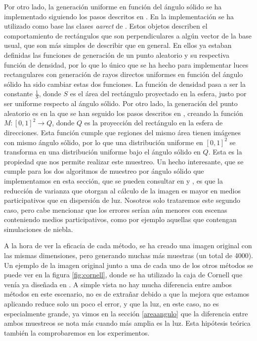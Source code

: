 \documentclass{scrbook}
\begin{document}
Por otro lado, la generación uniforme en función del ángulo sólido se ha implementado siguiendo los pasos descritos en \cite{ur2013}. En la implementación se ha utilizado como base las clases \textit{aarect} de \cite{RestOfYourLife}. Estos objetos describen el comportamiento de rectángulos que son perpendiculares a algún vector de la base usual, que son más simples de describir que en general. En ellos ya estaban definidas las funciones de generación de un punto aleatorio y su respectiva función de densidad, por lo que lo único que se ha hecho para implementar luces rectangulares con generación de rayos directos uniformes en función del ángulo sólido ha sido cambiar estas dos funciones. La función de densidad pasa a ser la constante $\frac{1}{S}$, donde $S$ es el área del rectángulo proyectado en la esfera, justo por ser uniforme respecto al ángulo sólido. Por otro lado, la generación del punto aleatorio es en la que se han seguido los pasos descritos en \cite{ur2013}, creando la función $M:[0,1]^2 \rightarrow Q$, donde $Q$ es la proyección del rectángulo en la esfera de direcciones. Esta función cumple que regiones del mismo área tienen imágenes con mismo ángulo sólido, por lo que una distribución uniforme en $[0,1]^2$ se transforma en una distribución uniforme bajo el ángulo sólido en $Q$. Esta es la propiedad que nos permite realizar este muestreo. Un hecho interesante, que se cumple para los dos algoritmos de muestreo por ángulo sólido que implementamos en esta sección, que se pueden consultar en \cite{ur2013} y \cite{ur2017}, es que la reducción de varianza que otorgan al cálculo de la imagen es mayor en medios participativos que en dispersión de luz. Nosotros solo trataremos este segundo caso, pero cabe mencionar que los errores serían aún menores con escenas conteniendo medios participativos, como por ejemplo aquellas que contengan simulaciones de niebla.

A la hora de ver la eficacia de cada método, se ha creado una imagen original con las mismas dimensiones, pero generando muchas más muestras (un total de 4000). Un ejemplo de la imagen original junto a una de cada uno de los otros métodos se puede ver en la figura \ref{fig:cornell}, donde se ha utilizado la caja de Cornell que venía ya diseñada en \cite{RestOfYourLife}. A simple vista no hay mucha diferencia entre ambos métodos en este escenario, no es de extrañar debido a que la mejora que estamos aplicando reduce solo un poco el error, y que la luz, en este caso, no es especialmente grande, ya vimos en la sección \ref{areaangulo} que la diferencia entre ambos muestreos se nota más cuando más amplia es la luz. Esta hipótesis teórica también la comprobaremos en los experimentos. 
\end{document}
